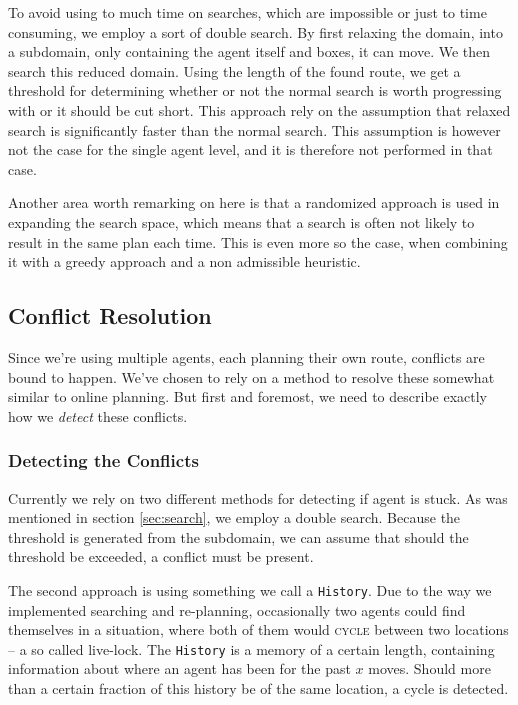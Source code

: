 \documentclass[letterpaper]{article}
\begin{document}
		
		To avoid using to much time on searches, which are impossible or just to time consuming, we employ a sort of double search. By first relaxing the domain, into a subdomain, only containing the agent itself and boxes, it can move. We then search this reduced domain. Using the length of the found route, we get a threshold for determining whether or not the normal search is worth progressing with or it should be cut short. This approach rely on the assumption that relaxed search is significantly faster than the normal search. This assumption is however not the case for the single agent level, and it is therefore not performed in that case.
		
		
		
		
		Another area worth remarking on here is that a randomized approach is used in expanding the search space, which means that a search is often not likely to result in the same plan each time. This is even more so the case, when combining it with a greedy approach and a non admissible heuristic.




	\subsection{Conflict Resolution}
		Since we're using multiple agents, each planning their own route, conflicts are bound to happen. We've chosen to rely on a method to resolve these somewhat similar to online planning. But first and foremost, we need to describe exactly how we \emph{detect} these conflicts.

		\subsubsection{Detecting the Conflicts}
			Currently we rely on two different methods for detecting if agent is stuck. As was mentioned in section \ref{sec:search}, we employ a double search. Because the threshold is generated from the subdomain, we can assume that should the threshold be exceeded, a conflict must be present.

			The second approach is using something we call a \verb=History=. Due to the way we implemented searching and re-planning, occasionally two agents could find themselves in a situation, where both of them would \textsc{cycle} between two locations -- a so called live-lock. The \verb=History= is a memory of a certain length, containing information about where an agent has been for the past $x$ moves. Should more than a certain fraction of this history be of the same location, a cycle is detected.
\end{document}
